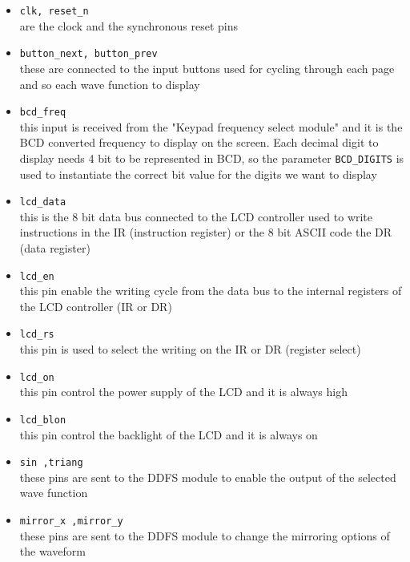 \begin{itemize}

    \item \texttt{clk, reset\_n} \\
    are the clock and the synchronous reset pins

    \item \texttt{button\_next, button\_prev} \\
    these are connected to the input buttons used for cycling through each page and so each wave function to display 

    \item \texttt{bcd\_freq} \\
    this input is received from the "Keypad frequency select module" and it is the BCD converted frequency to display on the screen. Each decimal digit to display needs 4 bit to be represented in BCD, so the parameter \texttt{BCD\_DIGITS} is used to instantiate the correct bit value for the digits we want to display

    \item \texttt{lcd\_data} \\
    this is the 8 bit data bus connected to the LCD controller used to write instructions in the IR (instruction register) or the 8 bit ASCII code the DR (data register)

    \item \texttt{lcd\_en} \\
    this pin enable the writing cycle from the data bus to the internal registers of the LCD controller (IR or DR)

    \item \texttt{lcd\_rs} \\
    this pin is used to select the writing on the IR or DR (register select) 

    \item \texttt{lcd\_on} \\
    this pin control the power supply of the LCD and it is always high 

    \item \texttt{lcd\_blon} \\
    this pin control the backlight of the LCD and it is always on 

    \item \texttt{sin ,triang} \\
    these pins are sent to the DDFS module to enable the output of the selected wave function 

    \item \texttt{mirror\_x ,mirror\_y} \\
    these pins are sent to the DDFS module to change the mirroring options of the waveform 
    
\end{itemize}

